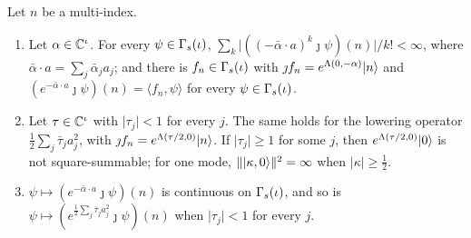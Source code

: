 \begin{veteenv}
\begin{lemma}\label{lem:dsq-lower}
Let $n$ be a multi-index.
\begin{enumerate}
\item[(a)] Let $\alpha\in\mathbb C^\iota$. For every $\psi\in\Gamma_s(\iota)$, $\sum_k\lvert((-\bar\alpha\cdot a)^k\jmath\psi)(n)\rvert/k!<\infty$,
where $\bar\alpha\cdot a=\sum_j\bar\alpha_ja_j$; and there is $f_n\in\Gamma_s(\iota)$ with $\jmath f_n=e^{\Lambda(0,-\alpha)}\lvert n\rangle$ and
$(e^{-\bar\alpha\cdot a}\jmath\psi)(n)=\langle f_n,\psi\rangle$ for every $\psi\in\Gamma_s(\iota)$.
\item[(b)] Let $\tau\in\mathbb C^\iota$ with $\lvert\tau_j\rvert<1$ for every $j$. The same holds for the lowering operator
$\frac12\sum_j\bar\tau_ja_j^2$, with $\jmath f_n=e^{\Lambda(\tau/2,0)}\lvert n\rangle$. If $\lvert\tau_j\rvert\ge1$ for some $j$, then
$e^{\Lambda(\tau/2,0)}\lvert 0\rangle$ is not square-summable; for one mode, $\lVert\lvert \kappa,0\rangle\rVert^2=\infty$ when
$\lvert\kappa\rvert\ge\frac12$.
\item[(c)] $\psi\mapsto(e^{-\bar\alpha\cdot a}\jmath\psi)(n)$ is continuous on $\Gamma_s(\iota)$, and so is
$\psi\mapsto(e^{\frac12\sum_j\bar\tau_ja_j^2}\jmath\psi)(n)$ when $\lvert\tau_j\rvert<1$ for every $j$.
\end{enumerate}
\end{lemma}


\end{veteenv}
